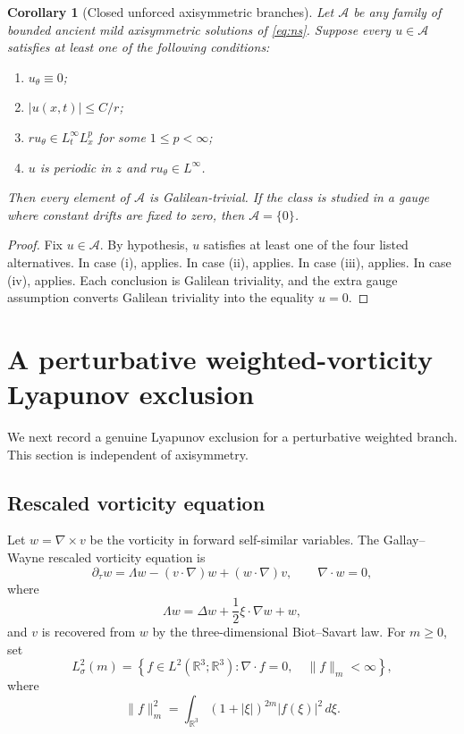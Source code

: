 \documentclass[11pt]{amsart}
\theoremstyle{plain}
\newtheorem{corollary}[theorem]{Corollary}
\theoremstyle{definition}
\theoremstyle{remark}
\numberwithin{equation}{section}
\begin{document}
\begin{corollary}[Closed unforced axisymmetric branches]\label{cor:axis-closed}
Let \(\mathcal A\) be any family of bounded ancient mild axisymmetric solutions
of \eqref{eq:ns}.  Suppose every \(u\in\mathcal A\) satisfies at least one of
the following conditions:
\begin{enumerate}[label=\textup{(\roman*)}]
\item \(u_\theta\equiv0\);
\item \(|u(x,t)|\le C/r\);
\item \(ru_\theta\in L_t^\infty L_x^p\) for some \(1\le p<\infty\);
\item \(u\) is periodic in \(z\) and \(ru_\theta\in L^\infty\).
\end{enumerate}
Then every element of \(\mathcal A\) is Galilean-trivial.  If the class is
studied in a gauge where constant drifts are fixed to zero, then
\(\mathcal A=\{0\}\).
\end{corollary}

\begin{proof}
Fix \(u\in\mathcal A\).  By hypothesis, \(u\) satisfies at least one of the
four listed alternatives.  In case (i),  applies.  In case
(ii),  applies.  In case (iii), 
applies.  In case (iv),  applies.  Each conclusion is
Galilean triviality, and the extra gauge assumption converts Galilean
triviality into the equality \(u=0\).
\end{proof}

\section{A perturbative weighted-vorticity Lyapunov exclusion}

We next record a genuine Lyapunov exclusion for a perturbative weighted branch.
This section is independent of axisymmetry.

\subsection{Rescaled vorticity equation}

Let \(w=\nabla\times v\) be the vorticity in forward self-similar variables.
The Gallay--Wayne rescaled vorticity equation is
\begin{equation}\label{eq:gallay-vorticity}
   \partial_\tau w
   =
   \Lambda w-(v\cdot\nabla)w+(w\cdot\nabla)v,
   \qquad \nabla\cdot w=0,
\end{equation}
where
\begin{equation}\label{eq:lambda}
   \Lambda w=\Delta w+\frac12 \xi\cdot\nabla w+w,
\end{equation}
and \(v\) is recovered from \(w\) by the three-dimensional Biot--Savart law.
For \(m\ge0\), set
\[
   L^2_\sigma(m)
   =
   \left\{
      f\in L^2(\mathbb R^3;\mathbb R^3):
      \nabla\cdot f=0,\quad
      \|f\|_m<\infty
   \right\},
\]
where
\[
   \|f\|_m^2
   =
   \int_{\mathbb R^3}(1+|\xi|)^{2m}|f(\xi)|^2\,d\xi .
\]
\end{document}
